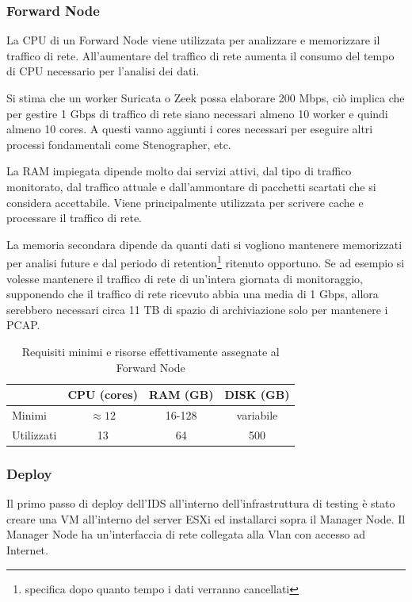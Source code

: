 \subsubsection*{Forward Node}
La CPU di un Forward Node viene utilizzata per analizzare e memorizzare il traffico di rete. All'aumentare del traffico di rete aumenta il consumo del tempo di CPU necessario per l'analisi dei dati. 

Si stima che un worker Suricata o Zeek possa elaborare 200 Mbps, ciò implica che per gestire 1 Gbps di traffico di rete siano necessari almeno 10 worker e quindi almeno 10 cores. A questi vanno aggiunti i cores necessari per eseguire altri processi fondamentali come Stenographer, etc.

La RAM impiegata dipende molto dai servizi attivi, dal tipo di traffico monitorato, dal traffico attuale e dall'ammontare di pacchetti scartati che si considera accettabile. Viene principalmente utilizzata per scrivere cache e processare il traffico di rete.

La memoria secondara dipende da quanti dati si vogliono mantenere memorizzati per analisi future e dal periodo di retention\footnote{specifica dopo quanto tempo i dati verranno cancellati} ritenuto opportuno.
Se ad esempio si volesse mantenere il traffico di rete di un'intera giornata di monitoraggio, supponendo che il traffico di rete ricevuto abbia una media di 1 Gbps, allora serebbero necessari circa 11 TB di spazio di archiviazione solo per mantenere i PCAP.

\begin{table}[hbtp]
    \centering
    \begin{tabular}{|l|c|c|c|}
        \hline
        & CPU (cores) & RAM (GB) & DISK (GB) \\
        \hline
        Minimi     & $\approx 12$ & 16-128 & variabile   \\
        \hline
        Utilizzati & 13   & 64  & 500 \\
        \hline
    \end{tabular}
    \caption{Requisiti minimi e risorse effettivamente assegnate al Forward Node}
    \label{tab:requisitiHw3}
\end{table}


\vspace{7mm}
\subsubsection*{Deploy}
Il primo passo di deploy dell'IDS all'interno dell'infrastruttura di testing è stato creare una VM all'interno del server ESXi ed installarci sopra il Manager Node. Il Manager Node ha un'interfaccia di rete collegata alla Vlan con accesso ad Internet.

